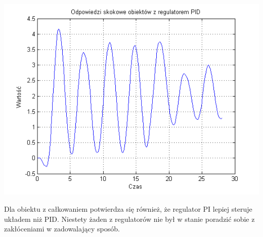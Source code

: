\documentclass[10pt,a4paper]{article}
\begin{document}
\includegraphics[scale=1]{images/cztery/skrypt_12.png}\\
\newpage

Dla obiektu z całkowaniem potwierdza się również, że regulator PI lepiej steruje układem niż PID. Niestety żaden z regulatorów nie był w stanie poradzić sobie z zakłóceniami w zadowalający sposób.
\newpage
\end{document}
